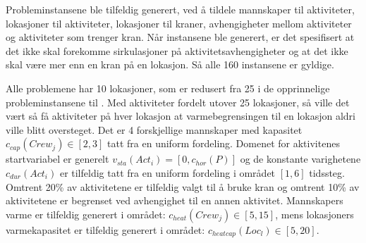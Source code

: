 Probleminstansene ble tilfeldig generert, ved å tildele mannskaper til aktiviteter, lokasjoner til aktiviteter, lokasjoner til kraner, avhengigheter mellom aktiviteter og aktiviteter som trenger kran. Når instansene ble generert, er det spesifisert at det ikke skal forekomme sirkulasjoner på aktivitetsavhengigheter og at det ikke skal være mer enn en kran på en lokasjon. Så alle 160 instansene er gyldige.

Alle problemene har 10 lokasjoner, som er redusert fra 25 i de opprinnelige probleminstansene til \bht. Med aktiviteter fordelt utover 25 lokasjoner, så ville det vært så få aktiviteter på hver lokasjon at varmebegrensingen til en lokasjon aldri ville blitt oversteget. Det er 4 forskjellige mannskaper med kapasitet $ c_{cap}(Crew_{j}) \in [2,3] $ tatt fra en uniform fordeling. Domenet for aktivitenes startvariabel er generelt $ v_{sta}(Act_{i}) = [0,c_{hor}(P)] $ og de konstante varighetene $ c_{dur}(Act_{i}) $ er tilfeldig tatt fra en uniform fordeling i området $ [1,6] $ tidssteg. Omtrent 20\% av aktivitetene er tilfeldig valgt til å bruke kran og omtrent 10\% av aktivitetene er begrenset ved avhengighet til en annen aktivitet. Mannskapers varme er tilfeldig generert i området: $c_{heat}(Crew_{j}) \in [5,15]$, mens lokasjoners varmekapasitet er tilfeldig generert i området: $c_{heatcap}(Loc_{l}) \in [5,20]$.